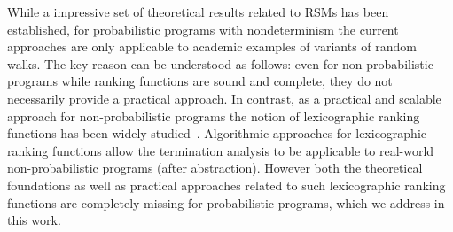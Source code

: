 \smallskip{} 
While a impressive set of theoretical results related to RSMs has been
established, for probabilistic programs with nondeterminism the current approaches  
are only applicable to academic examples of variants of random walks. 
The key reason can be understood as follows: even for non-probabilistic programs while 
ranking functions are sound and complete, they do not necessarily provide a practical 
approach. 
In contrast, as a practical and scalable approach for non-probabilistic programs the 
notion of lexicographic ranking functions has been widely studied~\cite{}. 
Algorithmic approaches for lexicographic ranking functions allow the termination analysis 
to be applicable to real-world non-probabilistic programs (after abstraction).
However both the theoretical foundations as well as practical approaches related to 
such lexicographic ranking functions are completely missing for probabilistic programs,
which we address in this work.







